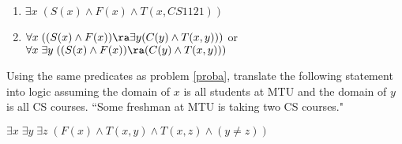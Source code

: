 \begin{questions}
\begin{solution}
\begin{enumerate}[label=(\alph*),itemsep=0pt,parsep=0pt,
    	topsep=0pt,partopsep=0pt]
            Conversationally, ``All freshman take CS1000."
        \item $\exists x\; (S(x) \wedge F(x) \wedge T(x,CS 1121))$
        \item $\forall x\; ((S(x) \wedge F(x)) \ra \exists y (C(y) \wedge T(x,y)))$ or \\
        $\forall x\; \exists y\; ((S(x) \wedge F(x)) \ra (C(y) \wedge T(x,y)))$
    \end{enumerate}
\end{solution}


\bonusquestion[2] Using the same predicates as problem \ref{proba}, translate the following statement into logic assuming the domain of $x$ is all students at MTU and the domain of $y$ is all CS courses.
``Some freshman at MTU is taking two CS courses."
    \ifprintanswers
        \vspace{-12pt}
    \fi
\begin{solution}
	$\exists x\; \exists y\; \exists z\;(F(x) \wedge T(x,y) \wedge T(x,z) \wedge (y \neq z))$
\end{solution}





\end{questions}
